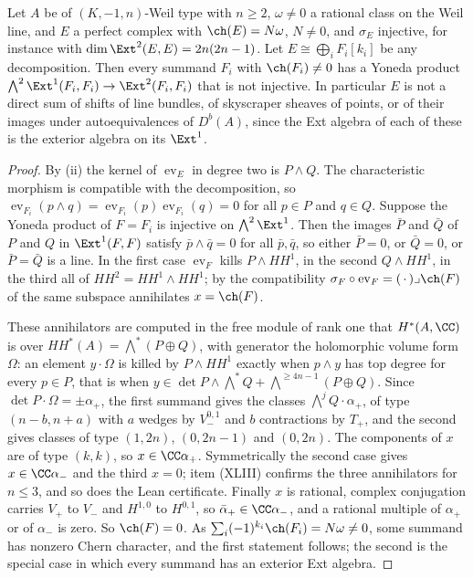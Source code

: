 \begin{theorem}\label{thm:nosum}
Let $A$ be of $(K,-1,n)$-Weil type with $n\ge2$, $\omega\ne0$ a rational class
on the Weil line, and $E$ a perfect complex with $\ch(E)=N\omega$, $N\ne0$, and
$\sigma_{E}$ injective, for instance with $\dim\Ext^{2}(E,E)=2n(2n-1)$. Let
$E\cong\bigoplus_{i}F_{i}[k_{i}]$ be any decomposition. Then every summand
$F_{i}$ with $\ch(F_{i})\ne0$ has a Yoneda product
$\bigwedge^{2}\Ext^{1}(F_{i},F_{i})\to\Ext^{2}(F_{i},F_{i})$ that is not
injective. In particular $E$ is not a direct sum of shifts of line bundles,
of skyscraper sheaves of points, or of their images under autoequivalences of
$D^{b}(A)$, since the Ext algebra of each of these is the exterior algebra on
its $\Ext^{1}$.
\end{theorem}

\begin{proof}
By (ii) the kernel of $\operatorname{ev}_{E}$ in degree
two is $P\wedge Q$. The characteristic morphism is compatible with the
decomposition, so $\operatorname{ev}_{F_{i}}(p\wedge q)=
\operatorname{ev}_{F_{i}}(p)\operatorname{ev}_{F_{i}}(q)=0$ for all
$p\in P$ and $q\in Q$. Suppose the Yoneda product of $F=F_{i}$ is injective on
$\bigwedge^{2}\Ext^{1}$. Then the images $\bar P$ and $\bar Q$ of $P$ and $Q$
in $\Ext^{1}(F,F)$ satisfy $\bar p\wedge\bar q=0$ for all $\bar p,\bar q$, so
either $\bar P=0$, or $\bar Q=0$, or $\bar P=\bar Q$ is a line. In the first
case $\operatorname{ev}_{F}$ kills $P\wedge HH^{1}$, in the second
$Q\wedge HH^{1}$, in the third all of $HH^{2}=HH^{1}\wedge HH^{1}$; by the
compatibility $\sigma_{F}\circ\operatorname{ev}_{F}=(\,\cdot\,)\lrcorner
\ch(F)$ of  the same subspace annihilates $x=\ch(F)$.

These annihilators are computed in the free module of rank one that
$H^{*}(A,\CC)$ is over $HH^{*}(A)=\bigwedge^{*}(P\oplus Q)$, with generator the
holomorphic volume form $\Omega$: an element $y\cdot\Omega$ is killed by
$P\wedge HH^{1}$ exactly when $p\wedge y$ has top degree for every $p\in P$,
that is when $y\in\det P\wedge\bigwedge^{*}Q+\bigwedge^{\ge4n-1}(P\oplus Q)$.
Since $\det P\cdot\Omega=\pm\alpha_{+}$, the first summand gives the classes
$\bigwedge^{j}Q\cdot\alpha_{+}$, of type $(n-b,n+a)$ with $a$ wedges by
$V_{-}^{0,1}$ and $b$ contractions by $T_{+}$, and the second gives classes of
type $(1,2n)$, $(0,2n-1)$ and $(0,2n)$. The components of $x$ are of type
$(k,k)$, so $x\in\CC\alpha_{+}$. Symmetrically the second case gives
$x\in\CC\alpha_{-}$ and the third $x=0$; item (XLIII) confirms the three
annihilators for $n\le3$, and so does the Lean certificate. Finally $x$ is
rational, complex conjugation carries $V_{+}$ to $V_{-}$ and $H^{1,0}$ to
$H^{0,1}$, so $\bar\alpha_{+}\in\CC\alpha_{-}$, and a rational multiple of
$\alpha_{+}$ or of $\alpha_{-}$ is zero. So $\ch(F)=0$. As
$\sum_{i}(-1)^{k_{i}}\ch(F_{i})=N\omega\ne0$, some summand has nonzero
Chern character, and the first statement follows; the second is the special
case in which every summand has an exterior Ext algebra.
\end{proof}

